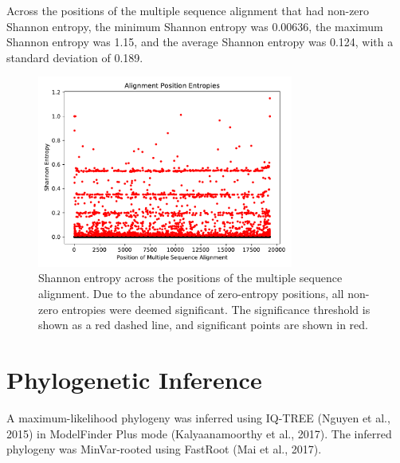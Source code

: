 \documentclass{article}
\begin{document}
 Across the positions of the multiple sequence alignment that had non-zero Shannon entropy, the minimum Shannon entropy was 0.00636, the maximum Shannon entropy was 1.15, and the average Shannon entropy was 0.124, with a standard deviation of 0.189.

\begin{figure}[h]
\centering
\includegraphics[width=0.75\textwidth,keepaspectratio]{./figs/alignment_entropies.pdf}
\caption{Shannon entropy across the positions of the multiple sequence alignment. Due to the abundance of zero-entropy positions, all non-zero entropies were deemed significant. The significance threshold is shown as a red dashed line, and significant points are shown in red.}
\end{figure}

\section{Phylogenetic Inference}
A maximum-likelihood phylogeny was inferred using IQ-TREE (Nguyen et al., 2015) in ModelFinder Plus mode (Kalyaanamoorthy et al., 2017). The inferred phylogeny was MinVar-rooted using FastRoot (Mai et al., 2017).
\end{document}
